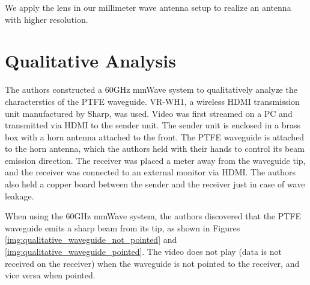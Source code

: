 \documentclass[a4paper,12pt]{report}
\begin{document}
We apply the lens in our millimeter wave antenna setup to
realize an antenna with higher resolution.

\section{Qualitative Analysis}

The authors constructed a 60GHz mmWave system to
qualitatively analyze the characterstics of the PTFE waveguide.
VR-WH1, a wireless HDMI transmission unit manufactured by Sharp, was used.
Video was first streamed on a PC and transmitted via HDMI to the sender unit.
The sender unit is enclosed in a brass box with a horn antenna attached to the front.
The PTFE waveguide is attached to the horn antenna,
which the authors held with their hands to control its beam emission direction.
The receiver was placed a meter away from the waveguide tip,
and the receiver was connected to an external monitor via HDMI.
The authors also held a copper board between the sender and the receiver
just in case of wave leakage.

When using the 60GHz mmWave system,
the authors discovered that the PTFE waveguide
emits a sharp beam from its tip,
as shown in Figures \ref{img:qualitative_waveguide_not_pointed} and \ref{img:qualitative_waveguide_pointed}.
The video does not play (data is not received on the receiver)
when the waveguide is not pointed to the receiver,
and vice versa when pointed.
\end{document}
